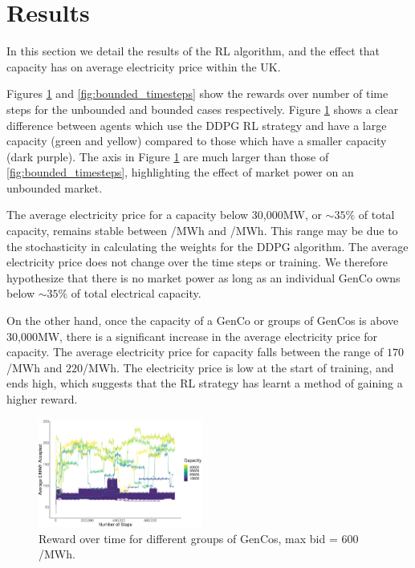 



\section{Results}
\label{sec:results}

In this section we detail the results of the RL algorithm, and the effect that capacity has on average electricity price within the UK.

Figures \ref{fig:unbounded_timesteps} and \ref{fig:bounded_timesteps} show the rewards over number of time steps for the unbounded and bounded cases respectively. Figure \ref{fig:unbounded_timesteps} shows a clear difference between agents which use the DDPG RL strategy and have a large capacity (green and yellow) compared to those which have a smaller capacity (dark purple). The axis in Figure \ref{fig:unbounded_timesteps} are much larger than those of \ref{fig:bounded_timesteps}, highlighting the effect of market power on an unbounded market.

The average electricity price for a capacity below 30,000MW, or ${\sim35\%}$ of total capacity, remains stable between /MWh and /MWh. This range may be due to the stochasticity in calculating the weights for the DDPG algorithm. The average electricity price does not change over the time steps or training. We therefore hypothesize that there is no market power as long as an individual GenCo owns below ${\sim35\%}$ of total electrical capacity. 

On the other hand, once the capacity of a GenCo or groups of GenCos is above 30,000MW, there is a significant increase in the average electricity price for capacity. The average electricity price for capacity falls between the range of  \textsterling$170$/MWh and \textsterling$220$/MWh. The electricity price is low at the start of training, and ends high, which suggests that the RL strategy has learnt a method of gaining a higher reward.




\begin{figure}
	\includegraphics[width=0.48\textwidth]{figures/results/unbounded_results.pdf}
	\caption{Reward over time for different groups of GenCos, max bid = \textsterling $600$/MWh.}
	\label{fig:unbounded_timesteps}
\end{figure}


